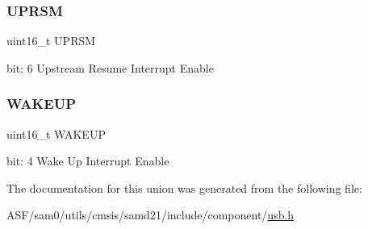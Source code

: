\subsubsection{\texorpdfstring{UPRSM}{UPRSM}}
{\footnotesize\ttfamily uint16\+\_\+t U\+P\+R\+SM}

bit\+: 6 Upstream Resume Interrupt Enable \mbox{\label{union_u_s_b___d_e_v_i_c_e___i_n_t_e_n_c_l_r___type_a8daebdfb4a00acfdbe16023d636e3887}} 
\subsubsection{\texorpdfstring{WAKEUP}{WAKEUP}}
{\footnotesize\ttfamily uint16\+\_\+t W\+A\+K\+E\+UP}

bit\+: 4 Wake Up Interrupt Enable 

The documentation for this union was generated from the following file\+:\begin{DoxyCompactItemize}
\item 
A\+S\+F/sam0/utils/cmsis/samd21/include/component/\mbox{\hyperlink{component_2usb_8h}{usb.\+h}}\end{DoxyCompactItemize}
